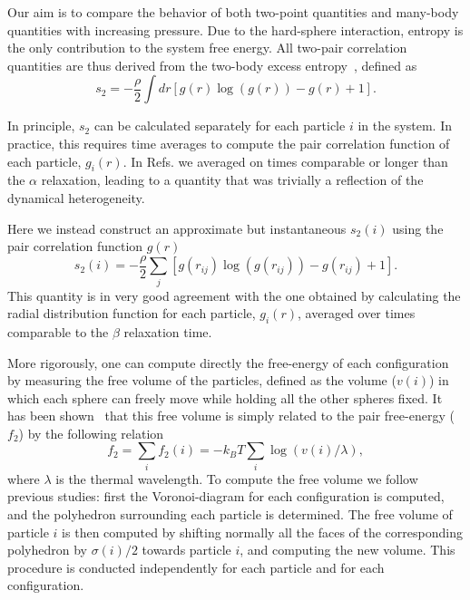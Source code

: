 \documentclass[twocolumn,superscriptaddress]{revtex4}
\begin{document}
Our aim is to compare the behavior of both two-point quantities and many-body quantities with increasing pressure.
Due to the hard-sphere interaction, entropy is the only contribution to the system free energy.
All two-pair correlation quantities are thus derived from the two-body excess entropy~\cite{Nettleton1958,Mountain1971},
defined as
\begin{equation}
s_2=-\frac{\rho}{2}\int dr\left[g(r)\log(g(r))-g(r)+1\right]. 
\end{equation}

In principle, $s_2$ can be calculated separately for each particle $i$ in the system. In practice, this requires time averages to compute the pair correlation function of each particle, $g_i(r)$. In Refs. \cite{tanaka,watanabe_walls,KawasakiJPCM} we averaged on times comparable or longer than the $\alpha$ relaxation, leading to a quantity that was trivially a reflection of the dynamical heterogeneity. 

Here we instead construct an approximate but instantaneous $s_2(i)$ using the pair correlation function $g(r)$
\begin{equation}
s_2(i) = -\frac{\rho}{2}\sum_j \left[g(r_{ij})\log(g(r_{ij}))-g(r_{ij})+1\right].
\end{equation}
This quantity is in very good agreement with the one obtained by calculating the radial distribution function for each
particle, $g_i(r)$, averaged over times comparable to the $\beta$ relaxation time.

More rigorously, one can compute directly the free-energy of each configuration by
measuring the free volume of the particles, defined as the volume ($v(i)$) in which each sphere can freely
move while holding all the other spheres fixed. It has been shown~\cite{Aste2004} that this free
volume is simply related to the pair free-energy ($f_2$) by the following relation
\begin{equation}
f_2=\sum_i f_2(i)=-k_BT\sum_i \log(v(i)/\lambda),
\end{equation}
where $\lambda$ is the thermal wavelength. To compute the free volume we follow previous
studies: first the Voronoi-diagram for each configuration is computed, and the polyhedron
surrounding each particle is determined. The free volume of particle $i$ is then
computed by shifting normally all the faces of the corresponding polyhedron by $\sigma(i)/2$
towards particle $i$, and computing the new volume. This procedure is conducted independently
for each particle and for each configuration.
\end{document}

